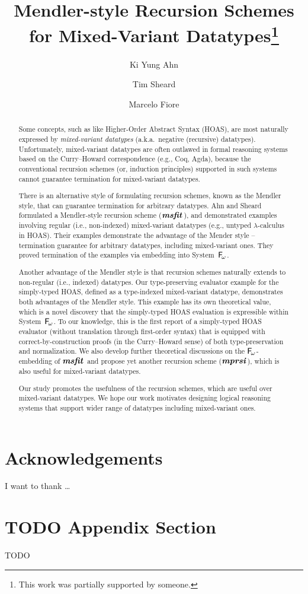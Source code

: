 \documentclass[a4paper,UKenglish]{lipics}
\title{Mendler-style Recursion Schemes for Mixed-Variant Datatypes\footnote{
	This work was partially supported by someone.} }
\author[1]{Ki Yung Ahn}
\author[1]{Tim Sheard}
\author[2]{Marcelo Fiore}
\affil[1]{Department of Computer Science, Portland State University\\
  Oregon, USA\\
  \texttt{\{kya,sheard\}@cs.pdx.edu}}
\affil[2]{Computer Laboratory, University of Cambridge\\
  Cambridge, UK\\
  \texttt{Marcelo.Fiore@cl.cam.ac.uk}}
\newcommand{\eg}[0]{{e.g.}}
\newcommand{\ie}[0]{{i.e.}}
\newcommand{\aka}[0]{{a.k.a.}}
\newcommand{\Fw}[0]{{\ensuremath{\mathsf{\uppercase{F}}_{\!\omega}}}}
\newcommand{\msfit}[1]{\ensuremath{\textbf{\textit{msfit}}_{#1}}}
\newcommand{\mprsi}[1]{\ensuremath{\textbf{\textit{mprsi}}_{#1}}}
\begin{document}
\maketitle

\begin{abstract}
Some concepts, such as like Higher-Order Abstract Syntax (HOAS),
are most naturally expressed by \emph{mixed-variant datatypes}
(\aka\ negative (recursive) datatypes). Unfortunately,
mixed-variant datatypes are often outlawed in formal reasoning systems
based on the Curry--Howard correspondence (\eg, Coq, Agda), because
the conventional recursion schemes (or, induction principles) supported in
such systems cannot guarantee termination for mixed-variant datatypes.

There is an alternative style of formulating recursion schemes,
known as the Mendler style, that can guarantee termination for
arbitrary datatypes. Ahn and Sheard \cite{AhnShe11} formulated
a Mendler-style recursion scheme (\msfit{}), and demonstrated
examples involving regular (\ie, non-indexed) mixed-variant datatypes
(\eg, untyped $\lambda$-calculus in HOAS). Their examples demonstrate
the advantage of the Mender style -- termination guarantee for
arbitrary datatypes, including mixed-variant ones. They proved
termination of the examples via embedding into System~\Fw.

Another advantage of the Mendler style is that recursion schemes
naturally extends to non-regular (\ie, indexed) datatypes.
Our type-preserving evaluator example for the simply-typed HOAS, defined as
a type-indexed mixed-variant datatype, demonstrates both advantages of
the Mendler style. This example has its own theoretical value, which is
a novel discovery that the simply-typed HOAS evaluation is expressible
within System~\Fw. To our knowledge, this is the first report of
a simply-typed HOAS evaluator (without translation through first-order syntax)
that is equipped with correct-by-construction proofs
(in the Curry--Howard sense) of both type-preservation and normalization.
We also develop further theoretical discussions on the \Fw-embedding of \msfit{}
and propose yet another recursion scheme (\mprsi{}), which is also useful for
mixed-variant datatypes.

Our study promotes the usefulness of the recursion schemes,
which are useful over mixed-variant datatypes. We hope our
work motivates designing logical reasoning systems that support
wider range of datatypes including mixed-variant ones.
\end{abstract}










\section*{Acknowledgements}
I want to thank \dots

\appendix
\section{TODO Appendix Section}
TODO


\end{document}

